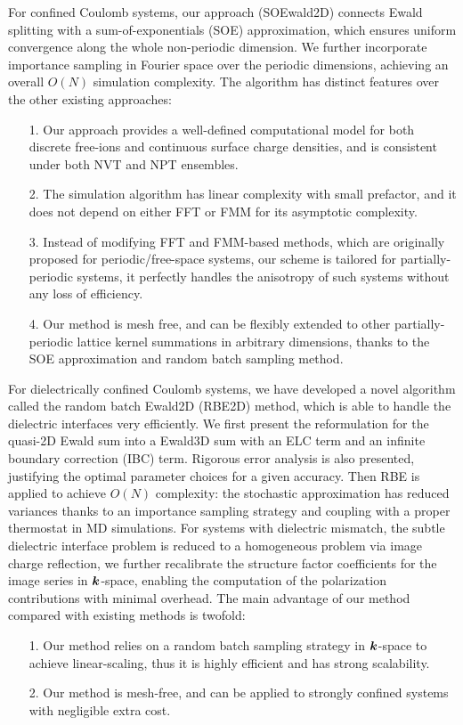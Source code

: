 For confined Coulomb systems, our approach (SOEwald2D) connects Ewald splitting with a sum-of-exponentials (SOE) approximation, which ensures uniform convergence along the whole non-periodic dimension. 
We further incorporate importance sampling in Fourier space over the periodic dimensions, achieving an overall $O(N)$ simulation complexity. 
The algorithm has distinct features over the other existing approaches:
\begin{itemize}
	\item[1.] Our approach provides a well-defined computational model for both discrete free-ions and continuous surface charge densities, and is consistent under both NVT and NPT ensembles.
	\item[2.] The simulation algorithm has linear complexity with small prefactor, and it does not depend on either FFT or FMM for its asymptotic complexity.
	\item[3.] Instead of modifying FFT and FMM-based methods, which are originally proposed for periodic/free-space systems, our scheme is tailored for partially-periodic systems, it perfectly handles the anisotropy of such systems without any loss of efficiency.
	\item[4.] Our method is mesh free, and can be flexibly extended to other partially-periodic lattice kernel summations in arbitrary dimensions, thanks to the SOE approximation and random batch sampling method.
\end{itemize}

For dielectrically confined Coulomb systems, we have developed a novel algorithm called the random batch Ewald2D (RBE2D) method, which is able to handle the dielectric interfaces very efficiently.
We first present the reformulation for the quasi-2D Ewald sum into a Ewald3D sum with an ELC term and an infinite boundary correction (IBC) term. Rigorous error analysis is also presented, justifying the optimal parameter choices for a given accuracy.
Then RBE is applied to achieve $O(N)$ complexity: the stochastic approximation has reduced variances thanks to an importance sampling strategy and coupling with a proper thermostat in MD simulations.
For systems with dielectric mismatch, the subtle dielectric interface problem is reduced to a homogeneous problem via image charge reflection,
we further recalibrate the structure factor coefficients for the image series in $\boldsymbol{k}$-space, 
enabling the computation of the polarization contributions with minimal overhead. 
The main advantage of our method compared with existing methods is twofold: 
\begin{itemize}
	\item[1.] Our method relies on a random batch sampling strategy in $\boldsymbol{k}$-space to achieve linear-scaling, thus it is highly efficient and has strong scalability.
	\item[2.] Our method is mesh-free, and can be applied to strongly confined systems with negligible extra cost.
\end{itemize}

